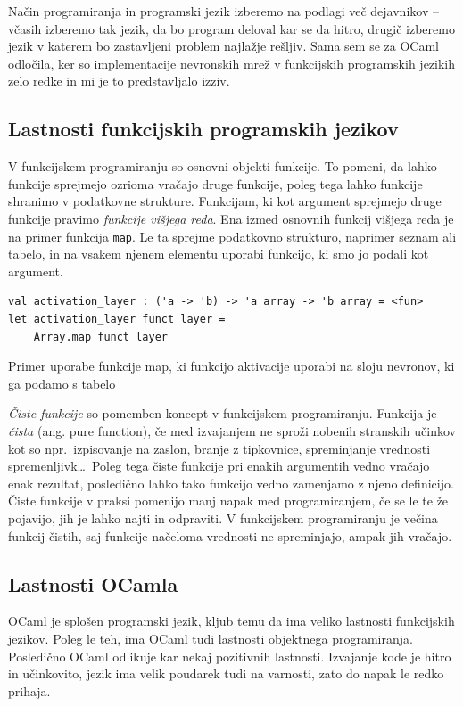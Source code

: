 \documentclass[mat1]{fmfdelo}
\begin{document}
Način programiranja in programski jezik izberemo na podlagi več dejavnikov -- včasih izberemo tak jezik, da bo program deloval kar se da hitro, drugič izberemo jezik v katerem bo zastavljeni problem najlažje rešljiv.
Sama sem se za OCaml odločila, ker so implementacije nevronskih mrež v funkcijskih programskih jezikih zelo redke in mi je to predstavljalo izziv. 
%
\subsection{Lastnosti funkcijskih programskih jezikov}
V funkcijskem programiranju so osnovni objekti funkcije. To pomeni, da lahko funkcije sprejmejo ozrioma vračajo druge funkcije, poleg tega lahko funkcije shranimo v podatkovne strukture. Funkcijam, ki kot argument sprejmejo druge funkcije pravimo \emph{funkcije višjega reda}. Ena izmed osnovnih funkcij višjega reda je na primer funkcija \texttt{map}. Le ta sprejme podatkovno strukturo, naprimer seznam ali tabelo, in na vsakem njenem elementu uporabi funkcijo, ki smo jo podali kot argument.
%
\begin{listing}[!h]
\begin{verbatim}
val activation_layer : ('a -> 'b) -> 'a array -> 'b array = <fun>
let activation_layer funct layer =
	Array.map funct layer
\end{verbatim} 
\caption{Primer uporabe funkcije map, ki funkcijo aktivacije uporabi na sloju nevronov, ki ga podamo s tabelo}
\label{algoritem}
\end{listing}

\emph{Čiste funkcije} so pomemben koncept v funkcijskem programiranju. Funkcija je \emph{čista} (ang. pure function), če med izvajanjem ne sproži nobenih stranskih učinkov kot so npr.\ izpisovanje na zaslon, branje z tipkovnice, spreminjanje vrednosti spremenljivk\ldots\ Poleg tega čiste funkcije pri enakih argumentih vedno vračajo enak rezultat, posledično lahko tako funkcijo vedno zamenjamo z njeno definicijo.  Čiste funkcije v praksi pomenijo manj napak med programiranjem, če se le te že pojavijo, jih je lahko najti in odpraviti. V funkcijskem programiranju je večina funkcij čistih, saj funkcije načeloma vrednosti ne spreminjajo, ampak jih vračajo. 
\subsection{Lastnosti OCamla}
OCaml je splošen programski jezik, kljub temu da ima veliko lastnosti funkcijskih jezikov. Poleg le teh, ima OCaml tudi lastnosti objektnega programiranja. 
Posledično OCaml odlikuje kar nekaj pozitivnih lastnosti. Izvajanje kode je hitro in učinkovito, jezik ima velik poudarek tudi na varnosti, zato do napak le redko prihaja.
\end{document}
